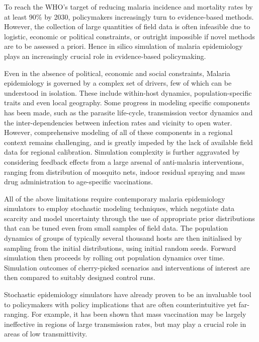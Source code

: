 \documentclass{article}
\begin{document}
To reach the WHO’s target of reducing malaria incidence and mortality rates by at least 90\% by 2030, policymakers increasingly turn to evidence-based methods. 
However, the collection of large quantities of field data is often infeasible due to logistic, economic or political constraints, or outright impossible if novel methods are to be assessed a priori. Hence in silico simulation of malaria epidemiology plays an increasingly crucial role in evidence-based policymaking.

Even in the absence of political, economic and social constraints, Malaria epidemiology is governed by a complex set of drivers, few of which can be understood in isolation. These include within-host dynamics, population-specific traits and even local geography. Some progress in modeling specific components has been made, such as the parasite life-cycle, transmission vector dynamics and the inter-dependencies between infection rates and vicinity to open water. However, comprehensive modeling of all of these components in a regional context remains challenging, and is greatly impeded by the lack of available field data for regional calibration. Simulation complexity is further aggravated by considering feedback effects from a large arsenal of anti-malaria interventions, ranging from distribution of mosquito nets, indoor residual spraying and mass drug administration to age-specific vaccinations. 

All of the above limitations require contemporary malaria epidemiology simulators to employ stochastic modeling techniques, which negotiate data scarcity and model uncertainty through the use of appropriate prior distributions that can be tuned even from small samples of field data. The population dynamics of groups of typically several thousand hosts are then initialised by sampling from the initial distributions, using initial random seeds. Forward simulation then proceeds by rolling out population dynamics over time. Simulation outcomes of cherry-picked scenarios and interventions of interest are then compared to suitably designed control runs.

Stochastic epidemiology simulators have already proven to be an invaluable tool to policymakers with policy implications that are often counterintuitive yet far-ranging. For example, it has been shown that mass vaccination may be largely ineffective in regions of large transmission rates, but may play a crucial role in areas of low transmittivity.
\end{document}
